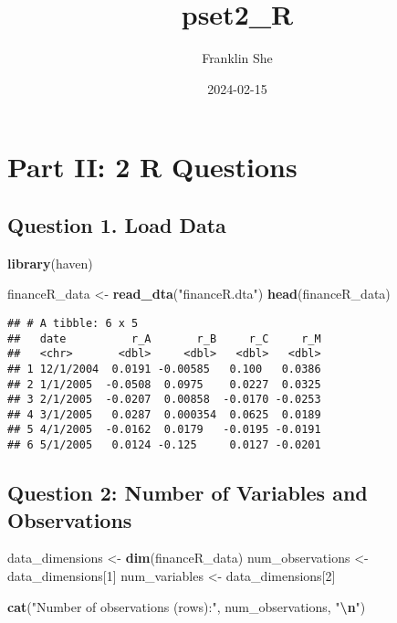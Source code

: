 \documentclass[
]{article}
\title{pset2\_R}
\author{Franklin She}
\date{2024-02-15}
\newenvironment{Shaded}{\begin{snugshade}}{\end{snugshade}}
\newcommand{\DecValTok}[1]{\textcolor[rgb]{0.00,0.00,0.81}{#1}}
\newcommand{\FunctionTok}[1]{\textcolor[rgb]{0.13,0.29,0.53}{\textbf{#1}}}
\newcommand{\NormalTok}[1]{#1}
\newcommand{\OtherTok}[1]{\textcolor[rgb]{0.56,0.35,0.01}{#1}}
\newcommand{\SpecialCharTok}[1]{\textcolor[rgb]{0.81,0.36,0.00}{\textbf{#1}}}
\newcommand{\StringTok}[1]{\textcolor[rgb]{0.31,0.60,0.02}{#1}}
\begin{document}
\maketitle

\hypertarget{part-ii-2-r-questions}{%
\section{Part II: 2 R Questions}\label{part-ii-2-r-questions}}

\hypertarget{question-1.-load-data}{%
\subsection{Question 1. Load Data}\label{question-1.-load-data}}

\begin{Shaded}
\begin{Highlighting}[]
\FunctionTok{library}\NormalTok{(haven)}

\NormalTok{financeR\_data }\OtherTok{\textless{}{-}} \FunctionTok{read\_dta}\NormalTok{(}\StringTok{"financeR.dta"}\NormalTok{)}
\FunctionTok{head}\NormalTok{(financeR\_data)}
\end{Highlighting}
\end{Shaded}

\begin{verbatim}
## # A tibble: 6 x 5
##   date          r_A       r_B     r_C     r_M
##   <chr>       <dbl>     <dbl>   <dbl>   <dbl>
## 1 12/1/2004  0.0191 -0.00585   0.100   0.0386
## 2 1/1/2005  -0.0508  0.0975    0.0227  0.0325
## 3 2/1/2005  -0.0207  0.00858  -0.0170 -0.0253
## 4 3/1/2005   0.0287  0.000354  0.0625  0.0189
## 5 4/1/2005  -0.0162  0.0179   -0.0195 -0.0191
## 6 5/1/2005   0.0124 -0.125     0.0127 -0.0201
\end{verbatim}

\hypertarget{question-2-number-of-variables-and-observations}{%
\subsection{Question 2: Number of Variables and
Observations}\label{question-2-number-of-variables-and-observations}}

\begin{Shaded}
\begin{Highlighting}[]
\NormalTok{data\_dimensions }\OtherTok{\textless{}{-}} \FunctionTok{dim}\NormalTok{(financeR\_data)}
\NormalTok{num\_observations }\OtherTok{\textless{}{-}}\NormalTok{ data\_dimensions[}\DecValTok{1}\NormalTok{]}
\NormalTok{num\_variables }\OtherTok{\textless{}{-}}\NormalTok{ data\_dimensions[}\DecValTok{2}\NormalTok{]}

\FunctionTok{cat}\NormalTok{(}\StringTok{"Number of observations (rows):"}\NormalTok{, num\_observations, }\StringTok{"}\SpecialCharTok{\textbackslash{}n}\StringTok{"}\NormalTok{)}
\end{Highlighting}
\end{Shaded}
\end{document}
